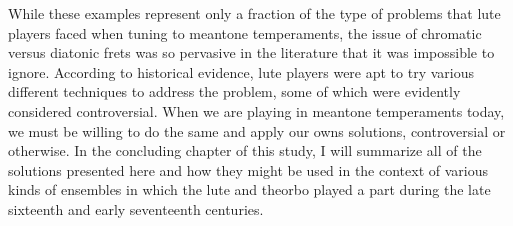 While these examples represent only a fraction of the type of problems that lute
players faced when tuning to meantone temperaments, the issue of chromatic versus
diatonic frets was so pervasive in the literature that it was impossible to ignore.
According to historical evidence, lute players were apt to try various different
techniques to address the problem, some of which were evidently considered
controversial. When we are playing in meantone temperaments today, we must be willing
to do the same and apply our owns solutions, controversial or otherwise.  In the
concluding chapter of this study, I will summarize all of the solutions presented here
and how they might be used in the context of various kinds of ensembles in which the
lute and theorbo played a part during the late sixteenth and early seventeenth
centuries.